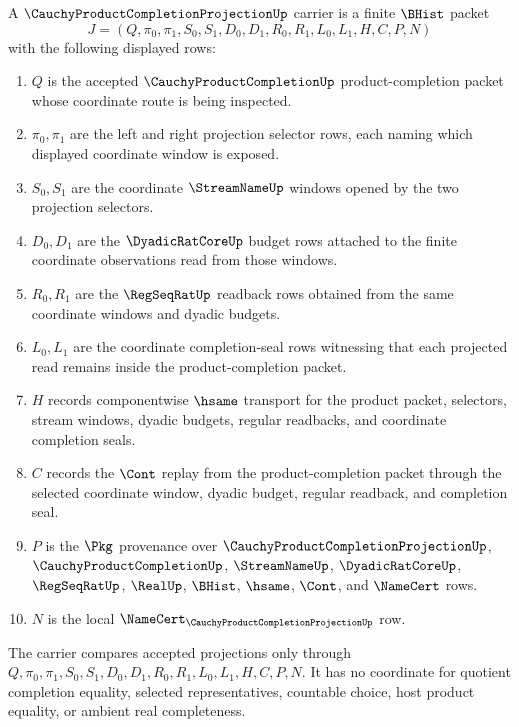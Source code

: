 \begin{definition}
\label{def:cauchy-product-completion-projection-carrier}
A $\CauchyProductCompletionProjectionUp$ carrier is a finite $\BHist$ packet
$$
J=(Q,\pi_0,\pi_1,S_0,S_1,D_0,D_1,R_0,R_1,L_0,L_1,H,C,P,N)
$$
with the following displayed rows:
\begin{enumerate}
\item $Q$ is the accepted $\CauchyProductCompletionUp$ product-completion packet whose coordinate route is being inspected.
\item $\pi_0,\pi_1$ are the left and right projection selector rows, each naming which displayed coordinate window is exposed.
\item $S_0,S_1$ are the coordinate $\StreamNameUp$ windows opened by the two projection selectors.
\item $D_0,D_1$ are the $\DyadicRatCoreUp$ budget rows attached to the finite coordinate observations read from those windows.
\item $R_0,R_1$ are the $\RegSeqRatUp$ readback rows obtained from the same coordinate windows and dyadic budgets.
\item $L_0,L_1$ are the coordinate completion-seal rows witnessing that each projected read remains inside the product-completion packet.
\item $H$ records componentwise $\hsame$ transport for the product packet, selectors, stream windows, dyadic budgets, regular readbacks, and coordinate completion seals.
\item $C$ records the $\Cont$ replay from the product-completion packet through the selected coordinate window, dyadic budget, regular readback, and completion seal.
\item $P$ is the $\Pkg$ provenance over $\CauchyProductCompletionProjectionUp$, $\CauchyProductCompletionUp$, $\StreamNameUp$, $\DyadicRatCoreUp$, $\RegSeqRatUp$, $\RealUp$, $\BHist$, $\hsame$, $\Cont$, and $\NameCert$ rows.
\item $N$ is the local $\NameCert_{\CauchyProductCompletionProjectionUp}$ row.
\end{enumerate}
The carrier compares accepted projections only through $Q,\pi_0,\pi_1,S_0,S_1,D_0,D_1,R_0,R_1,L_0,L_1,H,C,P,N$. It has no coordinate for quotient completion equality, selected representatives, countable choice, host product equality, or ambient real completeness.
\end{definition}

